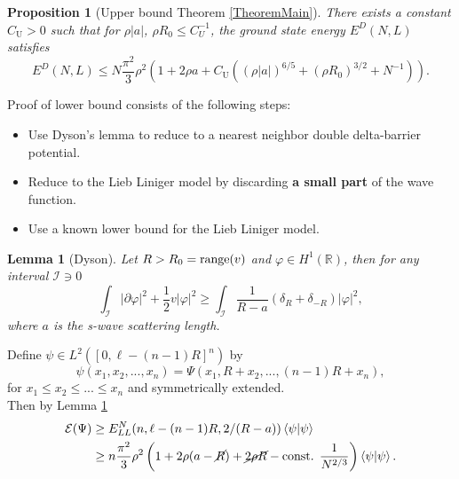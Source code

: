 \documentclass[final]{beamer}
\newcommand{\abs}[1]{\left\lvert #1 \right\rvert}
\renewcommand{\braket}[1]{\left\langle#1\right\rangle}
\newcommand{\R}{\mathbb{R}}
\newtheorem{mproposition}{Proposition}
\newtheorem{mlemma}{Lemma}
\newlength{\colwidth}
\begin{document}
\begin{frame}[t]
\begin{columns}[t]
\begin{column}{\colwidth}
\begin{tcolorbox}[colframe=qmathblue,colback=qmathbluelyslyslys,title=Upper bound proof sketch]
			\begin{mproposition}[Upper bound Theorem \ref{TheoremMain}]
				\label{PropositionUpperBound}
				There exists a constant $C_\text{U}>0$ such that for $\rho|a|$, $\rho R_0\leq C_U^{-1}$, the ground state energy $E^D(N,L)$ satisfies
				\small{\begin{equation}
					\label{equpper}
					E^D(N,L)\leq N\frac{\pi^2}{3}\rho^2\left(1+2\rho a + C_\text{U}\left((\rho\abs{a})^{6/5}+(\rho R_0)^{3/2}+N^{-1}\right)\right).
					\end{equation}}
			\end{mproposition}
		\end{tcolorbox}
		
	\begin{tcolorbox}[colframe=qmathblue,colback=qmathbluelyslyslys,title=Lower bound proof sketch]
		Proof of lower bound consists of the following steps:
		\begin{itemize}
			\item Use Dyson's lemma to reduce to a nearest neighbor double delta-barrier potential.
			\item Reduce to the Lieb Liniger model by discarding \textbf{a small part} of the wave function.
			\item Use a known lower bound for the Lieb Liniger model.
		\end{itemize}	
		\begin{mlemma}[Dyson]\label{LemmaDyson} Let $ R>R_0=\textnormal{range}(v) $ and $ \varphi\in H^1(\R) $, then for any interval $ \mathcal{I}\ni 0 $ 
			\begin{equation}
			\int_{\mathcal{I}} \abs{\partial \varphi}^2+\frac12 v\abs{\varphi}^2\geq \int_{\mathcal{I}}\frac{1}{R-a}\left(\delta_R+\delta_{-R}\right)\abs{\varphi}^2,
			\end{equation}
			where $ a $ is the s-wave scattering length.
		\end{mlemma}
		Define $ \psi\in L^2([0,\ell-(n-1)R]^n) $ by 
				$$ \psi(x_1,x_2,...,x_n)=\Psi(x_1,R+x_2,...,(n-1)R+x_n), $$
				for $ x_1\leq x_2\leq...\leq x_n $ and symmetrically extended.\\\vspace{0.2cm}
				Then by Lemma \ref{LemmaDyson} \begin{equation}
				\begin{aligned}
				\mathcal{E}(\Psi)&\geq E^N_{LL}(n,\ell-(n-1)R,2/(R-a))\braket{\psi|\psi}\\
				&\geq n\frac{\pi^2}{3}\rho^2\left(1+2\rho(a-\cancel{R})+\cancel{2\rho R}-\text{const. }\frac{1}{N^{2/3}}\right)\braket{\psi|\psi}.

\end{aligned}
\end{equation}
\end{tcolorbox}
\end{column}
\end{columns}
\end{frame}
\end{document}
